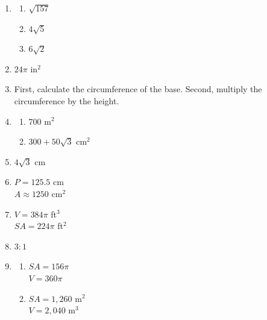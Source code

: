\documentclass{article}
\begin{document}
\begin{enumerate}
\begin{enumerate}
	\item True
	
	\end{enumerate}
	
\item

	\begin{enumerate}
	
	\item $\sqrt{157}$
	
	\item $4\sqrt{5}$
	
	\item $6\sqrt{2}$
	
	\end{enumerate}
	
\item $24\pi$ in$^2$

\item First, calculate the circumference of the base. Second, multiply the circumference by the height.

\item

	\begin{enumerate}
	
	\item 700 m$^2$
	
	\item $300 + 50\sqrt{3}$ cm$^2$
	
	\end{enumerate}
	
\item $4 \sqrt{3}$ cm

\item $P = 125.5$ cm \\
	$A \approx 1250$ cm$^2$
	
\item $V = 384 \pi$ ft$^3$ \\
	$SA = 224 \pi$ ft$^2$
	
\item $3:1$

\item 

	\begin{enumerate}
	
	\item $SA = 156 \pi$ \\
		$V = 360 \pi$
		
	\item $SA = 1,260$ m$^2$ \\
		$V = 2,040$ m$^3$
	

\end{enumerate}
\end{enumerate}
\end{document}
